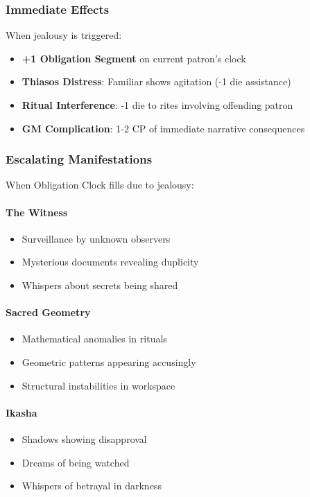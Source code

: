\documentclass[12pt,twoside]{book}
\begin{document}
\subsubsection{Immediate Effects}
When jealousy is triggered:
\begin{itemize}
\item \textbf{+1 Obligation Segment} on current patron's clock
\item \textbf{Thiasos Distress}: Familiar shows agitation (-1 die assistance)
\item \textbf{Ritual Interference}: -1 die to rites involving offending patron
\item \textbf{GM Complication}: 1-2 CP of immediate narrative consequences
\end{itemize}

\subsubsection{Escalating Manifestations}
When Obligation Clock fills due to jealousy:

\paragraph{The Witness}
\begin{itemize}
\item Surveillance by unknown observers
\item Mysterious documents revealing duplicity
\item Whispers about secrets being shared
\end{itemize}

\paragraph{Sacred Geometry}
\begin{itemize}
\item Mathematical anomalies in rituals
\item Geometric patterns appearing accusingly
\item Structural instabilities in workspace
\end{itemize}

\paragraph{Ikasha}
\begin{itemize}
\item Shadows showing disapproval
\item Dreams of being watched
\item Whispers of betrayal in darkness
\end{itemize}
\end{document}
